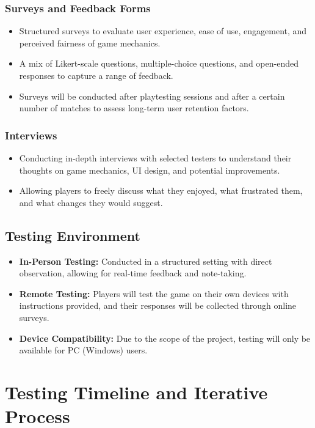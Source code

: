 \documentclass[12pt, titlepage]{article}
\begin{document}
\subsubsection{Surveys and Feedback Forms}
\begin{itemize}
    \item Structured surveys to evaluate user experience, ease of use, engagement, and perceived fairness of game mechanics.
    \item A mix of Likert-scale questions, multiple-choice questions, and open-ended responses to capture a range of feedback.
    \item Surveys will be conducted after playtesting sessions and after a certain number of matches to assess long-term user retention factors.
\end{itemize}

\subsubsection{Interviews}
\begin{itemize}
    \item Conducting in-depth interviews with selected testers to understand their thoughts on game mechanics, UI design, and potential improvements.
    \item Allowing players to freely discuss what they enjoyed, what frustrated them, and what changes they would suggest.
\end{itemize}

\subsection{Testing Environment}
\begin{itemize}
    \item \textbf{In-Person Testing:} Conducted in a structured setting with direct observation, allowing for real-time feedback and note-taking.
    \item \textbf{Remote Testing:} Players will test the game on their own devices with instructions provided, and their responses will be collected through online surveys.
    \item \textbf{Device Compatibility:} Due to the scope of the project, testing will only be available for PC (Windows) users.
\end{itemize}

\newpage

\section{Testing Timeline and Iterative Process}
\end{document}
